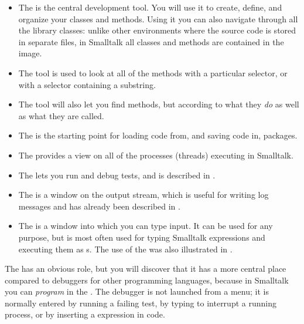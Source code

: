 \documentclass[a4paper,10pt,twoside]{book}
\begin{document}
\begin{itemize}
	\item {The } is the central development tool. You will use it to create, define, and organize your classes and methods. Using it you can also navigate through all the library classes: unlike other environments where the source code is stored in separate files, in Smalltalk all classes and methods are contained in the image.

	\item{The } tool is used to look at all of the methods with a particular selector, or with a selector containing a substring.
	
	\item{The } tool will also let you find methods, but according to what they \emph{do} as well as what they are called.
	
	\item{The } is the starting point for loading code from, and saving code in,  packages.
	
	\item{The  provides a view on all of the processes (threads) executing in Smalltalk.}
	
	\item{The } lets you run and debug \SUnit tests, and is described in .
	
	\item{The } is a window on the  output stream, which is useful for writing log messages and has already been described in .
	
	\item{The } is a window into which you can type input.  
	It can be used for any purpose, but is most often used for typing Smalltalk expressions and 
	executing them as s. The use of the  was also illustrated in .
\end{itemize}

The  has an obvious role, but you will discover that it has a more central place compared to debuggers for other programming languages, because in Smalltalk you can \emph{program} in the .  The debugger is not launched from a menu; it is normally entered by running a failing test, by typing  to interrupt a running process, or by inserting a  expression in code.
\end{document}
